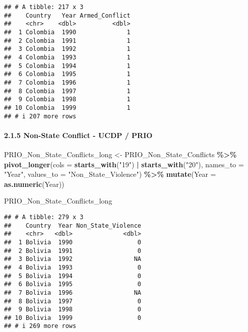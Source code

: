 \documentclass[
  11pt,
]{article}
\newenvironment{Shaded}{\begin{snugshade}}{\end{snugshade}}
\newcommand{\AttributeTok}[1]{\textcolor[rgb]{0.13,0.29,0.53}{#1}}
\newcommand{\FunctionTok}[1]{\textcolor[rgb]{0.13,0.29,0.53}{\textbf{#1}}}
\newcommand{\NormalTok}[1]{#1}
\newcommand{\OtherTok}[1]{\textcolor[rgb]{0.56,0.35,0.01}{#1}}
\newcommand{\SpecialCharTok}[1]{\textcolor[rgb]{0.81,0.36,0.00}{\textbf{#1}}}
\newcommand{\StringTok}[1]{\textcolor[rgb]{0.31,0.60,0.02}{#1}}
\begin{document}
\begin{verbatim}
## # A tibble: 217 x 3
##    Country   Year Armed_Conflict
##    <chr>    <dbl>          <dbl>
##  1 Colombia  1990              1
##  2 Colombia  1991              1
##  3 Colombia  1992              1
##  4 Colombia  1993              1
##  5 Colombia  1994              1
##  6 Colombia  1995              1
##  7 Colombia  1996              1
##  8 Colombia  1997              1
##  9 Colombia  1998              1
## 10 Colombia  1999              1
## # i 207 more rows
\end{verbatim}

\paragraph{2.1.5 Non-State Conflict - UCDP /
PRIO}\label{non-state-conflict---ucdp-prio}

\begin{Shaded}
\begin{Highlighting}[]
\NormalTok{PRIO\_Non\_State\_Conflicts\_long }\OtherTok{\textless{}{-}}\NormalTok{ PRIO\_Non\_State\_Conflicts }\SpecialCharTok{\%\textgreater{}\%}
  \FunctionTok{pivot\_longer}\NormalTok{(}\AttributeTok{cols =} \FunctionTok{starts\_with}\NormalTok{(}\StringTok{"19"}\NormalTok{) }\SpecialCharTok{|} \FunctionTok{starts\_with}\NormalTok{(}\StringTok{"20"}\NormalTok{), }
               \AttributeTok{names\_to =} \StringTok{"Year"}\NormalTok{, }\AttributeTok{values\_to =} \StringTok{"Non\_State\_Violence"}\NormalTok{) }\SpecialCharTok{\%\textgreater{}\%}
  \FunctionTok{mutate}\NormalTok{(}\AttributeTok{Year =} \FunctionTok{as.numeric}\NormalTok{(Year))}

\NormalTok{PRIO\_Non\_State\_Conflicts\_long}
\end{Highlighting}
\end{Shaded}

\begin{verbatim}
## # A tibble: 279 x 3
##    Country  Year Non_State_Violence
##    <chr>   <dbl>              <dbl>
##  1 Bolivia  1990                  0
##  2 Bolivia  1991                  0
##  3 Bolivia  1992                 NA
##  4 Bolivia  1993                  0
##  5 Bolivia  1994                  0
##  6 Bolivia  1995                  0
##  7 Bolivia  1996                 NA
##  8 Bolivia  1997                  0
##  9 Bolivia  1998                  0
## 10 Bolivia  1999                  0
## # i 269 more rows
\end{verbatim}
\end{document}
